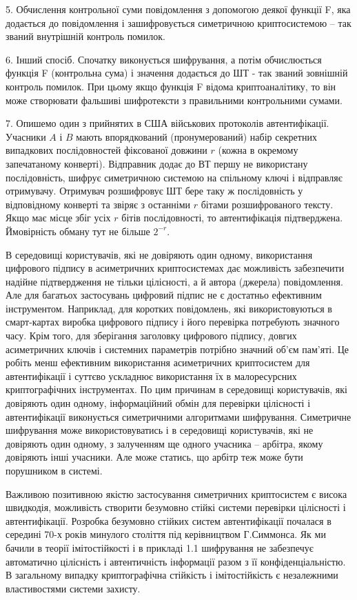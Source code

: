 5. Обчислення контрольної суми повідомлення з допомогою деякої
функції F, яка додається до повідомлення і зашифровується симетричною
криптосистемою – так званий внутрішній контроль помилок.

6. Інший спосіб. Спочатку виконується шифрування, а потім
обчислюється функція F (контрольна сума) і значення додається до ШТ - так
званий зовнішній контроль помилок. При цьому якщо функція F відома
криптоаналітику, то він може створювати фальшиві шифротексти з
правильними контрольними сумами.

7. Опишемо один з прийнятих в США військових протоколів
автентифікації. Учасники $A$ і $B$ мають впорядкований (пронумерований) набір
секретних випадкових послідовностей фіксованої довжини $r$ (кожна в
окремому запечатаному конверті). Відправник додає до ВТ першу не
використану послідовність, шифрує симетричною системою на спільному
ключі і відправляє отримувачу. Отримувач розшифровує ШТ бере таку ж
послідовність у відповідному конверті та звіряє з останніми $r$ бітами
розшифрованого тексту. Якщо має місце збіг усіх $r$ бітів послідовності, то
автентифікація підтверджена. Ймовірність обману тут не більше $2^{-r}$.

В середовищі користувачів, які не довіряють один одному, використання
цифрового підпису в асиметричних криптосистемах дає можливість
забезпечити надійне підтвердження не тільки цілісності, а й автора (джерела)
повідомлення. Але для багатьох застосувань цифровий підпис не є достатньо
ефективним інструментом. Наприклад, для коротких повідомлень, які
використовуються в смарт-картах виробка цифрового підпису і його перевірка
потребують значного часу. Крім того, для зберігання заголовку цифрового
підпису, довгих асиметричних ключів і системних параметрів потрібно
значний об’єм пам’яті. Це робіть менш ефективним використання
асиметричних криптосистем для автентифікації і суттєво ускладнює
використання їх в малоресурсних криптографічних інструментах. По цим
причинам в середовищі користувачів, які довіряють один одному,
інформаційний обмін для перевірки цілісності і автентифікації виконується
симетричними алгоритмами шифрування. Симетричне шифрування може
використовуватись і в середовищі користувачів, які не довіряють один одному,
з залученням ще одного учасника – арбітра, якому довіряють інші учасники.
Але може статись, що арбітр теж може бути порушником в системі.

Важливою позитивною якістю застосування симетричних криптосистем є
висока швидкодія, можливість створити безумовно стійкі системи перевірки
цілісності і автентифікації. Розробка безумовно стійких систем автентифікації
почалася в середині 70-х років минулого століття під керівництвом
Г.Симмонса. Як ми бачили в теорії імітостійкості і в прикладі 1.1 шифрування
не забезпечує автоматично цілісність і автентичність інформації разом з її
конфіденціальністю. В загальному випадку криптографічна стійкість і
імітостійкість є незалежними властивостями системи захисту. 



